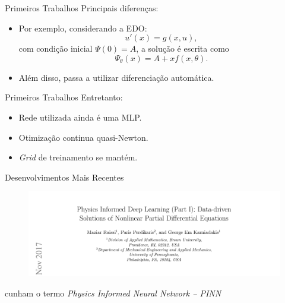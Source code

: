 \documentclass[13pt]{beamer}
\begin{document}
\begin{frame}{Primeiros Trabalhos}
    Principais diferenças:
    \begin{itemize}
        \item<1-> Por exemplo, considerando a EDO:
            \begin{equation*}
                u' ( x ) = g ( x, u )
            ,\end{equation*}
            com condição inicial \( \Psi ( 0 ) = A \), a solução é escrita como
            \begin{equation*}
                \Psi_{ \theta } ( x ) = A + x f ( x, \theta )
            .\end{equation*}
        \item<2-> Além disso, passa a utilizar diferenciação automática.
    \end{itemize}
\end{frame}

\begin{frame}{Primeiros Trabalhos}
    Entretanto:
    \begin{itemize}
        \item<1-> Rede utilizada ainda é uma MLP.
        \item<2-> Otimização continua quasi-Newton.
        \item<3-> \emph{Grid} de treinamento se mantém.
    \end{itemize}
\end{frame}

\begin{frame}{Desenvolvimentos Mais Recentes}
    \begin{figure}[htb]
        \includegraphics[width=\textwidth]{../figuras/pinn.png}
    \end{figure}
    \cite{raissi17} cunham o termo \emph{Physics Informed Neural Network -- PINN}
\end{frame}
\end{document}

